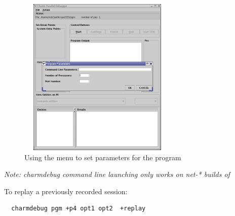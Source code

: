 \documentclass[10pt]{article}
\begin{document}
\begin{figure}[]
\includegraphics[scale=0.5, height=3in, width=3in]{figs/menu}
\caption{Using the menu to set parameters for the \charmpp{} program}
\label{menu}
\end{figure}




\emph{Note: charmdebug command line launching only works on net-*
builds of \charmpp{} }

To replay a previously recorded session:

\begin{verbatim}
  charmdebug pgm +p4 opt1 opt2  +replay
\end{verbatim}






\end{document}
